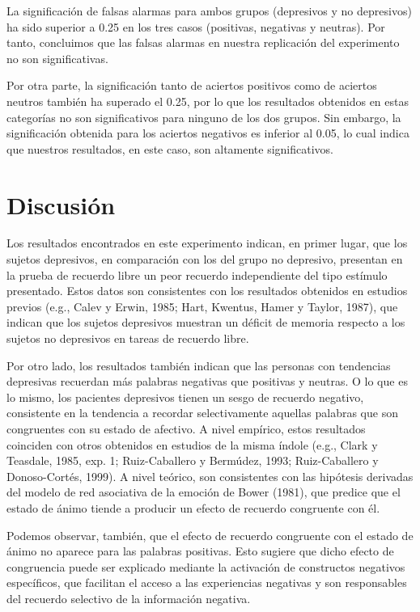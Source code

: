 \documentclass[a4paper,11pt]{article}
\begin{document}
La significación de falsas alarmas para ambos grupos (depresivos y no depresivos) ha sido superior a 0.25 en los tres casos (positivas, negativas y neutras). Por tanto, concluimos que las falsas alarmas en nuestra replicación del experimento no son significativas.

Por otra parte, la significación tanto de aciertos positivos como de aciertos neutros también ha superado el 0.25, por lo que los resultados obtenidos en estas categorías no son significativos para ninguno de los dos grupos. Sin embargo, la significación obtenida para los aciertos negativos es inferior al 0.05, lo cual indica que nuestros resultados, en este caso, son altamente significativos.


\section{Discusión}
Los resultados encontrados en este experimento indican, en primer lugar, que los sujetos depresivos, en comparación con los del grupo no depresivo, presentan en la prueba de recuerdo libre un peor recuerdo independiente del tipo estímulo presentado. Estos datos son consistentes con los resultados obtenidos en estudios previos (e.g., Calev y Erwin, 1985; Hart, Kwentus, Hamer y Taylor, 1987), que indican que los sujetos depresivos muestran un déficit de memoria respecto a los sujetos no depresivos en tareas de recuerdo libre. 

Por otro lado, los resultados también indican que las personas con tendencias depresivas recuerdan más palabras negativas que positivas y neutras. O lo que es lo mismo, los pacientes depresivos tienen un sesgo de recuerdo negativo, consistente en la tendencia a recordar selectivamente aquellas palabras que son congruentes con su estado de afectivo. A nivel empírico, estos resultados coinciden con otros obtenidos en estudios de la misma índole (e.g., Clark y Teasdale, 1985, exp. 1; Ruiz-Caballero y Bermúdez, 1993; Ruiz-Caballero y Donoso-Cortés, 1999). A nivel teórico, son consistentes con las hipótesis derivadas del modelo de red asociativa de la emoción de Bower (1981), que predice que el estado de ánimo tiende a producir un efecto de recuerdo congruente con él. 

Podemos observar, también, que el efecto de recuerdo congruente con el estado de ánimo no aparece para las palabras positivas. Esto sugiere que dicho efecto de congruencia puede ser explicado mediante la activación de constructos negativos específicos, que facilitan el acceso a las experiencias negativas y son responsables del recuerdo selectivo de la información negativa. 
\end{document}
